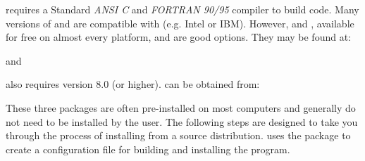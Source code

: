 \parflow{} requires a Standard \emph{ANSI C} and \emph{FORTRAN 90/95}
compiler to build code. Many versions of  and  are
compatible with \parflow{} (e.g. Intel or IBM).  However,  and , available for
free on almost every platform, and are good options. They may be found at:
\begin{center}
\end{center}
and
\begin{center}
\end{center}
\parflow{} also requires  version 8.0 (or higher).   can be obtained from:
\begin{center}
\end{center}
These three packages are often pre-installed on most computers and
generally do not need to be installed by the user.  The following
steps are designed to take you through the process of installing
\parflow{} from a source distribution.  \parflow{} uses the 
package  to create a configuration file for building
and installing the \parflow{} program.

